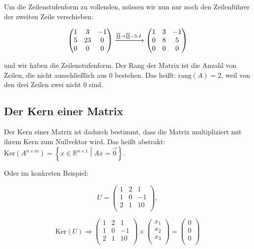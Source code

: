 \documentclass{scrartcl}
\newcommand{\ro}[1]{\ensuremath{\overline{\textrm{\underline{#1}}}}}
\begin{document}
Um die Zeilenstufenform zu vollenden, müssen wir nun nur noch den Zeilenführer der zweiten Zeile verschieben:

\begin{equation}
	\begin{pmatrix*}
		1 & 3 & -1\\
		5 & 23 & 0\\
		0 & 0 & 0\\
	\end{pmatrix*} \xrightarrow{\ro{II} \rightarrow \ro{II} - 5\cdot I} \begin{pmatrix*}
		1 & 3 & -1\\
		0 & 8 & 5\\
		0 & 0 & 0\\
	\end{pmatrix*}
\end{equation}

und wir haben die Zeilenstufenform. Der Rang der Matrix ist die Anzahl von Zeilen, die nicht ausschließlich aus 0 bestehen.
Das heißt: $\textrm{rang}(A) = 2$, weil von den drei Zeilen zwei nicht 0 sind.

\subsection{Der Kern einer Matrix}

Der Kern einer Matrix ist dadurch bestimmt, dass die Matrix multipliziert mit ihrem Kern zum Nullvektor wird. Das heißt abstrakt:
$\textrm{Ker}(A^{n\times m}) = \left\{x \in \mathbb{R}^{n\times 1} \middle| Ax = \vec{0}\right\}$.

Oder im konkreten Beispiel:

\begin{equation}
	U = \begin{pmatrix*}
		1 & 2 & 1 \\
		1 & 0 & -1 \\
		2 & 1 & 10 \\
	\end{pmatrix*},
\end{equation}

\begin{equation}
	\textrm{Ker}\left(U\right) \Rightarrow
	\begin{pmatrix*}
		1 & 2 & 1 \\
		1 & 0 & -1 \\
		2 & 1 & 10 \\
	\end{pmatrix*} \times \begin{pmatrix*}
		x_1 \\
		x_2 \\
		x_3 \\
	\end{pmatrix*} =
	\begin{pmatrix*}
		0\\
		0\\
		0\\
	\end{pmatrix*}
\end{equation}
\end{document}
